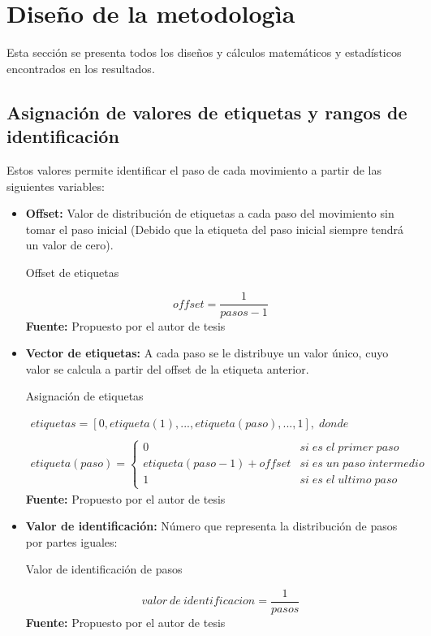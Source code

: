\section{Dise\~no de la metodolog\`ia}\label{dis}
Esta secci\'on se presenta todos los dise\~nos y c\'alculos matem\'aticos y estad\'isticos encontrados en los resultados. 
\subsection{Asignaci\'on de valores de etiquetas y rangos de identificaci\'on}\label{dis:asig}
Estos valores permite identificar el paso de cada movimiento a partir de las siguientes variables:
\begin{itemize}
\item \textbf{Offset:} Valor de distribuci\'on de etiquetas a cada paso del movimiento sin tomar el paso inicial (Debido que la etiqueta del paso inicial siempre tendr\'a un valor de cero).
\begin{formula}[H]
	\centering
	\caption{Offset de etiquetas}
	\label{frm:offsetEt}
	\begin{equation}
offset = \frac{1}{pasos-1}
	\end{equation}
	\textbf{Fuente:} Propuesto por el autor de tesis
\end{formula}
\item \textbf{Vector de etiquetas:} A cada paso se le distribuye un valor \'unico, cuyo valor se calcula a partir del offset de la etiqueta anterior.
\begin{formula}[H]
	\centering
	\caption{Asignaci\'on de etiquetas}
	\label{frm:vecEtiq}
	\begin{equation}
\begin{matrix}
etiquetas=[0, etiqueta(1), ..., etiqueta(paso), ..., 1],\; donde
\\
\\
etiqueta(paso) =
\left\{\begin{matrix}
0 & si\; es\; el\; primer \; paso
\\
etiqueta(paso-1)+offset & si\; es\; un\; paso\; intermedio
\\ 
1 & si\; es\; el\; ultimo\; paso
\end{matrix}\right.
\end{matrix}
	\end{equation}
	\textbf{Fuente:} Propuesto por el autor de tesis
\end{formula} 

\item \textbf{Valor de identificaci\'on:} N\'umero que representa la distribuci\'on de pasos por partes iguales:
\begin{formula}[H]
	\centering
	\caption{Valor de identificaci\'on de pasos}
	\label{frm:idenStep}
	\begin{equation}
valor \: de \: identificacion = \frac{1}{pasos}
	\end{equation}
	\textbf{Fuente:} Propuesto por el autor de tesis
\end{formula} 


\end{itemize}
